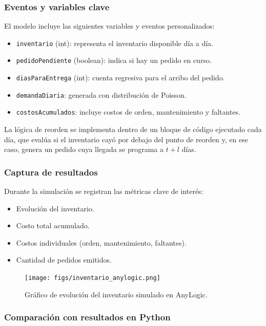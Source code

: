 \documentclass[12pt]{article}
\begin{document}
\subsubsection*{Eventos y variables clave}

El modelo incluye las siguientes variables y eventos personalizados:

\begin{itemize}
    \item \texttt{inventario} (int): representa el inventario disponible día a día.
    \item \texttt{pedidoPendiente} (boolean): indica si hay un pedido en curso.
    \item \texttt{diasParaEntrega} (int): cuenta regresiva para el arribo del pedido.
    \item \texttt{demandaDiaria}: generada con distribución de Poisson.
    \item \texttt{costosAcumulados}: incluye costos de orden, mantenimiento y faltantes.
\end{itemize}

La lógica de reorden se implementa dentro de un bloque de código ejecutado cada día, que evalúa si el inventario cayó por debajo del punto de reorden y, en ese caso, genera un pedido cuya llegada se programa a \( t + l \) días.

\subsubsection*{Captura de resultados}

Durante la simulación se registran las métricas clave de interés:

\begin{itemize}
    \item Evolución del inventario.
    \item Costo total acumulado.
    \item Costos individuales (orden, mantenimiento, faltantes).
    \item Cantidad de pedidos emitidos.
\end{itemize}

\begin{figure}[H]
    \centering
    \texttt{[image: figs/inventario\_anylogic.png]}
    \caption{Gráfico de evolución del inventario simulado en AnyLogic.}
\end{figure}

\subsubsection*{Comparación con resultados en Python}
\end{document}
